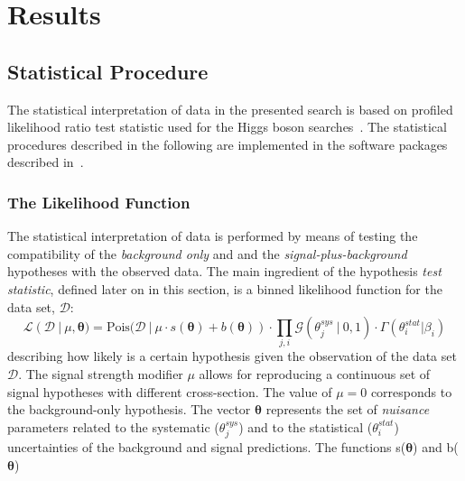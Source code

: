 
\section{Results}
\label{sec:result}

\subsection{Statistical Procedure }
\label{sec:limits}
The statistical interpretation of data in the presented search is based on profiled likelihood ratio test statistic used
for the Higgs boson searches~\cite{lhclimits}. The statistical procedures described in the 
following are implemented in the software packages described in~\cite{roofit,roostat,histfactory}.

\subsubsection{The Likelihood Function}
The statistical interpretation of data is performed by means of testing the compatibility
of the \textit{background only}  and and the \textit{signal-plus-background}  hypotheses with the observed data.  
The main ingredient of the hypothesis \emph{test statistic}, defined later on in this section,  
is a binned likelihood function for the data set, $\mathcal{D}$:
\begin{equation}\label{likelihood}
\mathcal{L}(\mathcal{D}~|~\mu, \boldsymbol{\theta}) = \text{Pois(}\mathcal{D}~ |~ \mu \cdot s(\boldsymbol{\theta}) 
	+ b(\boldsymbol{\theta})) \cdot \prod_{j,i}\mathcal{G}(\theta_j^{sys} ~ | ~ 0, 1) \cdot \Gamma(\theta^{stat}_i | \beta_i)
\end{equation}
describing how likely is a certain hypothesis given the observation of the data set $\mathcal{D}$.
The signal strength modifier $\mu$ allows for reproducing a continuous set of signal hypotheses with 
different cross-section. The value of $\mu= 0$ corresponds to the background-only hypothesis. 
The vector $\boldsymbol{\theta}$ represents the set of \emph{nuisance} parameters  related to
the systematic ($\theta_j^{sys}$) and to the statistical ($\theta^{stat}_i$) 
uncertainties of the background and signal predictions. 
The functions s($\boldsymbol{\theta}$) and  b($\boldsymbol{\theta}$)
